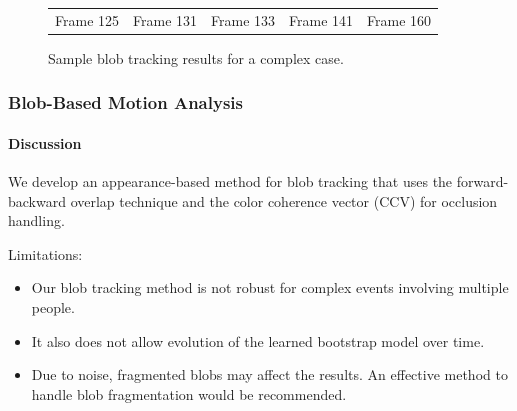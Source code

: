 \begin{frame}
\begin{figure}
\begin{tabular}{ccccc}
            \\
            \small Frame 125 & 
            \small Frame 131 & 
            \small Frame 133 & 
            \small Frame 141 & 
            \small Frame 160
        \end{tabular}
        \caption{Sample blob tracking results for a complex case.}
        \label{fig:complex-tracking-results}
    \end{figure}

\end{frame}


\begin{frame}
    \frametitle{Blob-Based Motion Analysis}
    \framesubtitle{Discussion}

    We develop an appearance-based method for blob tracking 
    that uses the forward-backward overlap technique and the 
    color coherence vector (CCV) for occlusion handling.

    \medskip

    Limitations: 
    \begin{itemize}
        \item Our blob tracking method is not robust for complex events 
            involving multiple people.
        \item It also does not allow evolution of the learned bootstrap 
            model over time.
        \item Due to noise, fragmented blobs may affect the results. An 
            effective method to handle blob fragmentation would be 
            recommended.
    \end{itemize}

\end{frame}


